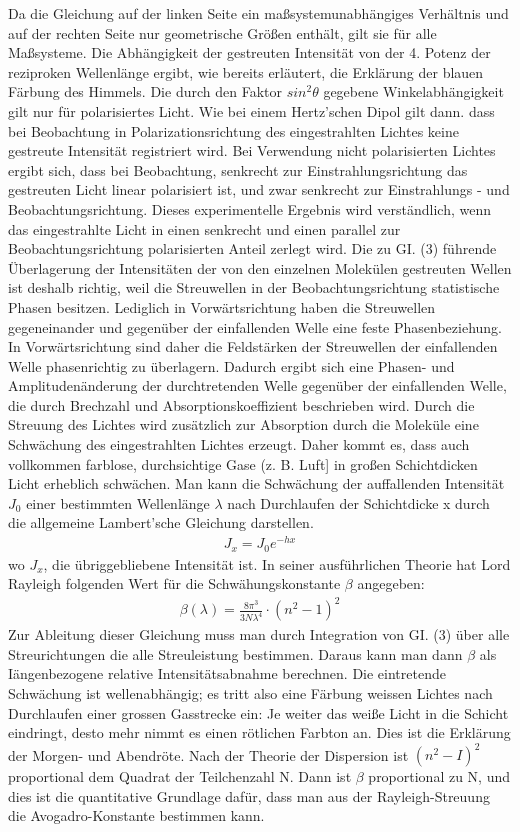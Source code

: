 Da die Gleichung auf der linken Seite ein maßsystemunabhängiges Verhältnis und auf der rechten Seite nur geometrische Größen enthält, gilt sie für alle Maßsysteme.
Die Abhängigkeit der gestreuten Intensität von der 4. Potenz der reziproken Wellenlänge ergibt, wie bereits erläutert, die Erklärung der blauen Färbung des Himmels.
Die durch den Faktor $sin^2\theta$ gegebene Winkelabhängigkeit gilt nur für polarisiertes Licht. Wie bei einem Hertz’schen Dipol gilt dann. dass bei Beobachtung in Polarizationsrichtung des eingestrahlten Lichtes keine gestreute Intensität registriert wird. Bei Verwendung nicht polarisierten Lichtes ergibt sich, dass bei Beobachtung, senkrecht zur Einstrahlungsrichtung das gestreuten Licht linear polarisiert ist, und zwar senkrecht zur Einstrahlungs - und Beobachtungsrichtung. Dieses experimentelle Ergebnis wird verständlich, wenn das eingestrahlte Licht in einen senkrecht und einen parallel zur Beobachtungsrichtung polarisierten Anteil zerlegt wird.
Die zu GI. (3) führende Überlagerung der Intensitäten der von den einzelnen Molekülen gestreuten Wellen ist deshalb richtig, weil die Streuwellen in der Beobachtungsrichtung statistische Phasen besitzen. Lediglich in Vorwärtsrichtung haben die Streuwellen gegeneinander und gegenüber der einfallenden Welle eine feste Phasenbeziehung. In Vorwärtsrichtung sind daher die Feldstärken der Streuwellen der einfallenden Welle phasenrichtig zu überlagern. Dadurch ergibt sich eine Phasen- und Amplitudenänderung der durchtretenden Welle gegenüber der einfallenden Welle, die durch Brechzahl und Absorptionskoeffizient beschrieben wird.
Durch die Streuung des Lichtes wird zusätzlich zur Absorption durch die Moleküle eine Schwächung des eingestrahlten Lichtes erzeugt. Daher kommt es, dass auch vollkommen farblose, durchsichtige Gase (z. B. Luft] in großen Schichtdicken Licht erheblich schwächen. Man kann die Schwächung der auffallenden Intensität $J_0$ einer bestimmten Wellenlänge $\lambda$ nach Durchlaufen der Schichtdicke x durch die allgemeine Lambert'sche Gleichung darstellen.
\begin{align}
J_x = J_0 e^{-hx}
\end{align}
wo $J_x$, die übriggebliebene Intensität ist. In seiner ausführlichen Theorie hat Lord Rayleigh folgenden Wert für die Schwähungskonstante $\beta$ angegeben:
\begin{align}
\beta(\lambda) = \frac{8\pi^3}{3N\lambda^4}\cdot(n^2-1)^2
\end{align}
Zur Ableitung dieser Gleichung muss man durch Integration von GI. (3) über alle Streurichtungen die alle Streuleistung bestimmen. Daraus kann man dann $\beta$ als Iängenbezogene relative Intensitätsabnahme berechnen.
Die eintretende Schwächung ist wellenabhängig; es tritt also eine Färbung weissen Lichtes nach Durchlaufen einer grossen Gasstrecke ein: Je weiter das weiße Licht in die Schicht eindringt, desto mehr nimmt es einen rötlichen Farbton an.
Dies ist die Erklärung der Morgen- und Abendröte.
Nach der Theorie der Dispersion ist $(n^2 - I )^2$ proportional dem Quadrat der Teilchenzahl N. Dann ist $\beta$ proportional zu N, und dies ist die quantitative Grundlage dafür, dass man aus der Rayleigh-Streuung die Avogadro-Konstante bestimmen kann.
